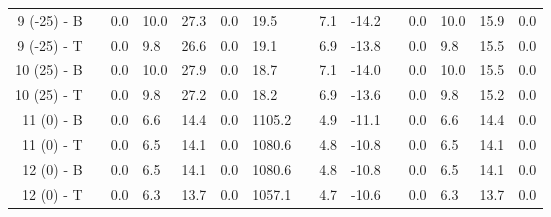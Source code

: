 \begin{table}[H]
\begin{longtable}{@{}rllllllllllllll@{}}
 9 (-25) - B &&     0.0 &    10.0 &    27.3 &     0.0 &   19.5 &&  7.1 & -14.2 & &     0.0 &     10.0 &     15.9 &      0.0 \\
 9 (-25) - T &&     0.0 &     9.8 &    26.6 &     0.0 &   19.1 &&  6.9 & -13.8 & &     0.0 &      9.8 &     15.5 &      0.0 \\\midrule
 10 (25) - B &&     0.0 &    10.0 &    27.9 &     0.0 &   18.7 &&  7.1 & -14.0 & &     0.0 &     10.0 &     15.5 &      0.0 \\
 10 (25) - T &&     0.0 &     9.8 &    27.2 &     0.0 &   18.2 &&  6.9 & -13.6 & &     0.0 &      9.8 &     15.2 &      0.0 \\\midrule
  11 (0) - B &&     0.0 &     6.6 &    14.4 &     0.0 & 1105.2 &&  4.9 & -11.1 & &     0.0 &      6.6 &     14.4 &      0.0 \\
  11 (0) - T &&     0.0 &     6.5 &    14.1 &     0.0 & 1080.6 &&  4.8 & -10.8 & &     0.0 &      6.5 &     14.1 &      0.0 \\\midrule
  12 (0) - B &&     0.0 &     6.5 &    14.1 &     0.0 & 1080.6 &&  4.8 & -10.8 & &     0.0 &      6.5 &     14.1 &      0.0 \\
  12 (0) - T &&     0.0 &     6.3 &    13.7 &     0.0 & 1057.1 &&  4.7 & -10.6 & &     0.0 &      6.3 &     13.7 &      0.0 \\\bottomrule
\end{longtable}
\end{table}
